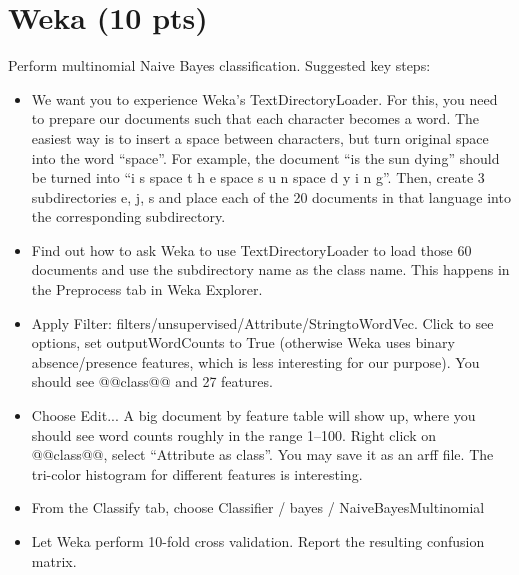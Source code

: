 \documentclass[a4paper]{article}
\theoremstyle{definition}
\begin{document}
\section{Weka (10 pts)}
Perform multinomial Naive Bayes classification.  Suggested key steps:
\begin{itemize}
\item We want you to experience Weka's TextDirectoryLoader.  For this, you need to prepare our documents such that each character becomes a word.  The easiest way is to insert a space between characters, but turn original space into the word ``space''.  For example, the document ``is the sun dying'' should be turned into ``i s space t h e space s u n space d y i n g''.
Then, create 3 subdirectories e, j, s and place each of the 20 documents in that language into the corresponding subdirectory.  
\item Find out how to ask Weka to use TextDirectoryLoader to load those 60 documents and use the subdirectory name as the class name.  This happens in the Preprocess tab in Weka Explorer.
\item Apply Filter: filters/unsupervised/Attribute/StringtoWordVec. Click to see options, set outputWordCounts to True (otherwise Weka uses binary absence/presence features, which is less interesting for our purpose). You should see @@class@@ and 27 features.
\item Choose Edit...  A big document by feature table will show up, where you should see word counts roughly in the range 1--100.  Right click on @@class@@, select ``Attribute as class''.  You may save it as an arff file.
The tri-color histogram for different features is interesting.
\item From the Classify tab, choose Classifier / bayes / NaiveBayesMultinomial
\item Let Weka perform 10-fold cross validation.  Report the resulting confusion matrix.


\end{itemize}
\end{document}
